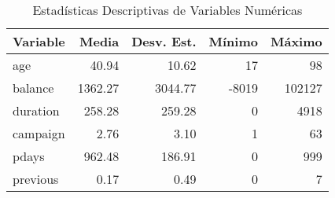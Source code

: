 \documentclass[10pt]{article}
\begin{document}
\begin{table}[h!]
\centering
\caption{Estadísticas Descriptivas de Variables Numéricas}
\label{tab:estadisticas_numericas}
\begin{tabular}{lrrrr}
\hline
\textbf{Variable} & \textbf{Media} & \textbf{Desv. Est.} & \textbf{Mínimo} & \textbf{Máximo}  \\
\hline
age & 40.94 & 10.62 & 17 & 98  \\
balance & 1362.27 & 3044.77 &-8019 & 102127 \\
duration & 258.28 & 259.28 & 0 & 4918  \\
campaign & 2.76 & 3.10 & 1 & 63  \\
pdays & 962.48 & 186.91 & 0 & 999  \\
previous & 0.17 & 0.49 & 0 & 7  \\
\hline
\end{tabular}
\end{table}
\end{document}
